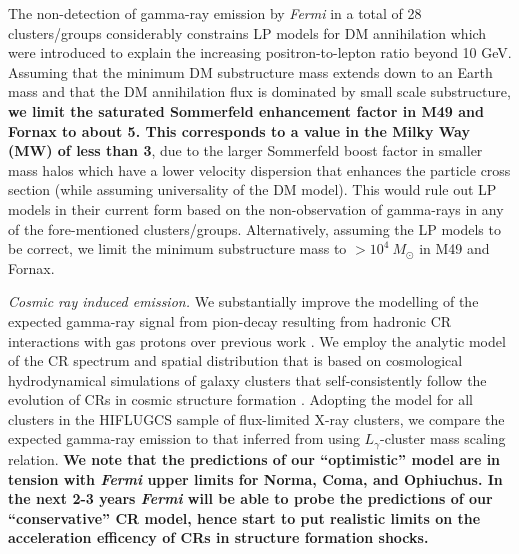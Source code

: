 \documentclass[10pt,aps,pra,reprint,amsmath,amsfonts,amssymb,showpacs,nofootinbib,floatfix]{revtex4-1}
\def\del#1{{}}
\def\C#1{{\bf #1}}
\newcommand{\Fermi}{{\em Fermi}\xspace}
\newcommand{\msun}{M_\odot}
\begin{document}
The non-detection of gamma-ray emission by \Fermi in a total of 28
clusters/groups considerably constrains LP models for DM annihilation
which were introduced to explain the increasing positron-to-lepton
ratio beyond 10 GeV. Assuming that the minimum DM substructure mass
extends down to an Earth mass and that the DM annihilation flux is
dominated by small scale substructure, \C{we limit the saturated
Sommerfeld enhancement factor in M49 and Fornax to about 5. This
corresponds to a value in the Milky Way (MW) of less than 3}, due to
the larger Sommerfeld boost factor in smaller mass halos which have a
lower velocity dispersion that enhances the particle cross section
(while assuming universality of the DM model). This would rule out LP
models in their current form based on the non-observation of
gamma-rays in any of the fore-mentioned
clusters/groups. Alternatively, assuming the LP models to be correct,
we limit the minimum substructure mass to $>10^4~\msun$ in M49 and
Fornax.

{\em Cosmic ray induced emission.} We substantially improve the
modelling of the expected gamma-ray signal from pion-decay resulting
from hadronic CR interactions with gas protons over previous work
\citep{2010ApJ...717L..71A}. We employ the analytic model of the CR
spectrum and spatial distribution that is based on cosmological
hydrodynamical simulations of galaxy clusters that self-consistently
follow the evolution of CRs in cosmic structure formation
\citet{2010MNRAS.409..449P}. Adopting the model for all clusters in
the HIFLUGCS sample of flux-limited X-ray clusters, we compare the
expected gamma-ray emission to that inferred from using
$L_\gamma$-cluster mass scaling relation. \C{We note that the
  predictions of our ``optimistic'' model are in tension with \Fermi
  upper limits for Norma, Coma, and Ophiuchus. In the next 2-3 years
  \Fermi will be able to probe the predictions of our ``conservative''
  CR model, hence start to put realistic limits on the acceleration
  efficency of CRs in structure formation shocks.}  \del{agreement
  with \Fermi upper limits for all clusters. The hint of a tension
  that the scaling relation modeling showed for Norma
  \citep{2010ApJ...717L..71A} could not be confirmed due to the lower
  gas density of this cluster relative to the average.  }
\end{document}
